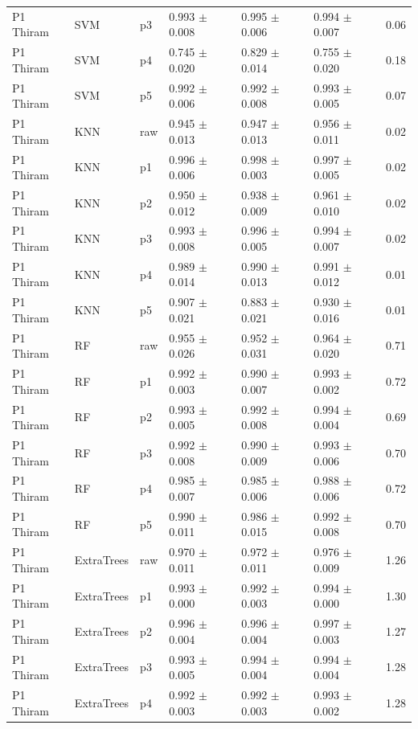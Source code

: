 {\begin{longtable}{L{2.35cm}L{2.4cm}L{1.0cm}L{2.35cm}L{2.25cm}L{2.25cm}L{1.45cm}}
P1 Thiram & SVM & p3 & 0.993 $\pm$ 0.008 & 0.995 $\pm$ 0.006 & 0.994 $\pm$ 0.007 & 0.06 \\
P1 Thiram & SVM & p4 & 0.745 $\pm$ 0.020 & 0.829 $\pm$ 0.014 & 0.755 $\pm$ 0.020 & 0.18 \\
P1 Thiram & SVM & p5 & 0.992 $\pm$ 0.006 & 0.992 $\pm$ 0.008 & 0.993 $\pm$ 0.005 & 0.07 \\
P1 Thiram & KNN & raw & 0.945 $\pm$ 0.013 & 0.947 $\pm$ 0.013 & 0.956 $\pm$ 0.011 & 0.02 \\
P1 Thiram & KNN & p1 & 0.996 $\pm$ 0.006 & 0.998 $\pm$ 0.003 & 0.997 $\pm$ 0.005 & 0.02 \\
P1 Thiram & KNN & p2 & 0.950 $\pm$ 0.012 & 0.938 $\pm$ 0.009 & 0.961 $\pm$ 0.010 & 0.02 \\
P1 Thiram & KNN & p3 & 0.993 $\pm$ 0.008 & 0.996 $\pm$ 0.005 & 0.994 $\pm$ 0.007 & 0.02 \\
P1 Thiram & KNN & p4 & 0.989 $\pm$ 0.014 & 0.990 $\pm$ 0.013 & 0.991 $\pm$ 0.012 & 0.01 \\
P1 Thiram & KNN & p5 & 0.907 $\pm$ 0.021 & 0.883 $\pm$ 0.021 & 0.930 $\pm$ 0.016 & 0.01 \\
P1 Thiram & RF & raw & 0.955 $\pm$ 0.026 & 0.952 $\pm$ 0.031 & 0.964 $\pm$ 0.020 & 0.71 \\
P1 Thiram & RF & p1 & 0.992 $\pm$ 0.003 & 0.990 $\pm$ 0.007 & 0.993 $\pm$ 0.002 & 0.72 \\
P1 Thiram & RF & p2 & 0.993 $\pm$ 0.005 & 0.992 $\pm$ 0.008 & 0.994 $\pm$ 0.004 & 0.69 \\
P1 Thiram & RF & p3 & 0.992 $\pm$ 0.008 & 0.990 $\pm$ 0.009 & 0.993 $\pm$ 0.006 & 0.70 \\
P1 Thiram & RF & p4 & 0.985 $\pm$ 0.007 & 0.985 $\pm$ 0.006 & 0.988 $\pm$ 0.006 & 0.72 \\
P1 Thiram & RF & p5 & 0.990 $\pm$ 0.011 & 0.986 $\pm$ 0.015 & 0.992 $\pm$ 0.008 & 0.70 \\
P1 Thiram & ExtraTrees & raw & 0.970 $\pm$ 0.011 & 0.972 $\pm$ 0.011 & 0.976 $\pm$ 0.009 & 1.26 \\
P1 Thiram & ExtraTrees & p1 & 0.993 $\pm$ 0.000 & 0.992 $\pm$ 0.003 & 0.994 $\pm$ 0.000 & 1.30 \\
P1 Thiram & ExtraTrees & p2 & 0.996 $\pm$ 0.004 & 0.996 $\pm$ 0.004 & 0.997 $\pm$ 0.003 & 1.27 \\
P1 Thiram & ExtraTrees & p3 & 0.993 $\pm$ 0.005 & 0.994 $\pm$ 0.004 & 0.994 $\pm$ 0.004 & 1.28 \\
P1 Thiram & ExtraTrees & p4 & 0.992 $\pm$ 0.003 & 0.992 $\pm$ 0.003 & 0.993 $\pm$ 0.002 & 1.28 \\

\end{longtable}}
